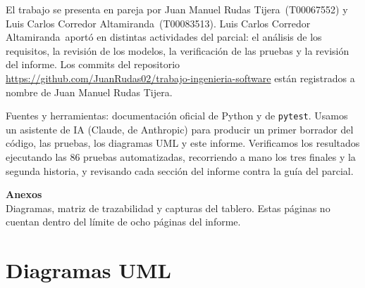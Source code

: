\documentclass[11pt,letterpaper]{article}
\newcommand{\cod}[1]{\texttt{#1}}
\newcommand{\integranteA}{Juan Manuel Rudas Tijera}
\newcommand{\codigo}{T00067552}
\newcommand{\integranteB}{Luis Carlos Corredor Altamiranda}
\newcommand{\codigoB}{T00083513}
\newcommand{\repo}{https://github.com/JuanRudas02/trabajo-ingenieria-software}
\begin{document}
El trabajo se presenta en pareja por \integranteA\ (\codigo) y \integranteB\ (\codigoB). \integranteB\ aportó en distintas actividades del parcial: el análisis de los requisitos, la revisión de los modelos, la verificación de las pruebas y la revisión del informe. Los commits del repositorio \url{\repo} están registrados a nombre de \integranteA.

Fuentes y herramientas: documentación oficial de Python y de \cod{pytest}. Usamos un asistente de IA (Claude, de Anthropic) para producir un primer borrador del código, las pruebas, los diagramas UML y este informe. Verificamos los resultados ejecutando las 86 pruebas automatizadas, recorriendo a mano los tres finales y la segunda historia, y revisando cada sección del informe contra la guía del parcial.

\clearpage
\appendix
\renewcommand{\thesection}{\Alph{section}}
\titleformat{\section}{\normalfont\large\bfseries}{Anexo \thesection.}{0.5em}{}
\renewcommand{\thefigure}{\thesection.\arabic{figure}}
\setcounter{figure}{0}
\renewcommand{\thepage}{A-\arabic{page}}
\setcounter{page}{1}

\begin{center}
{\Large\bfseries Anexos}\\[2pt]
{\small Diagramas, matriz de trazabilidad y capturas del tablero. Estas páginas no cuentan dentro del límite de ocho páginas del informe.}
\end{center}

\section{Diagramas UML}\label{anx:uml}
\end{document}
